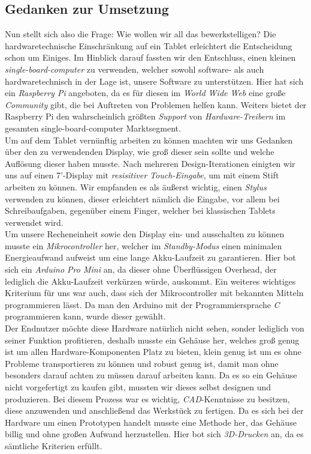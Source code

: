 \subsection{Gedanken zur Umsetzung}
Nun stellt sich also die Frage: Wie wollen wir all das bewerkstelligen? Die hardwaretechnische Einschränkung auf ein Tablet erleichtert die Entscheidung schon um Einiges. Im Hinblick darauf fassten wir den Entschluss, einen kleinen \textit{single-board-computer} zu verwenden, welcher sowohl software- als auch hardwaretechnisch in der Lage ist, unsere Software zu unterstützen. Hier hat sich ein \textit{Raspberry Pi} angeboten, da es für diesen im \textit{World Wide Web} eine große \textit{Community} gibt, die bei Auftreten von Problemen helfen kann. Weiters bietet der Raspberry Pi den wahrscheinlich größten \textit{Support} von \textit{Hardware-Treibern} im gesamten single-board-computer Marktsegment.\\

Um auf dem Tablet vernünftig arbeiten zu können machten wir uns Gedanken über den zu verwendenden Display, wie groß dieser sein sollte und welche Auflösung dieser haben musste. Nach mehreren Design-Iterationen einigten wir uns auf einen 7'-Display mit \textit{resisitiver Touch-Eingabe}, um mit einem Stift arbeiten zu können. Wir empfanden es als äußerst wichtig, einen \textit{Stylus} verwenden zu können, dieser erleichtert nämlich die Eingabe, vor allem bei Schreibaufgaben, gegenüber einem Finger, welcher bei klassischen Tablets verwendet wird.\\

Um unsere Recheneinheit sowie den Display ein- und ausschalten zu können musste ein \textit{Mikrocontroller} her, welcher im \textit{Standby-Modus} einen minimalen Energieaufwand aufweist um eine lange Akku-Laufzeit zu garantieren. Hier bot sich ein \textit{Arduino Pro Mini} an, da dieser ohne Überflüssigen Overhead, der lediglich die Akku-Laufzeit verkürzen würde, auskommt. Ein weiteres wichtiges Kriterium für uns war auch, dass sich der Mikrocontroller mit bekannten Mitteln programmieren lässt. Da man den Arduino mit der Programmiersprache \textit{C} programmieren kann, wurde dieser gewählt.\\

Der Endnutzer möchte diese Hardware natürlich nicht sehen, sonder lediglich von seiner Funktion profitieren, deshalb musste ein Gehäuse her, welches groß genug ist um allen Hardware-Komponenten Platz zu bieten, klein genug ist um es ohne Probleme transportieren zu können und robust genug ist, damit man ohne besonders darauf achten zu müssen darauf arbeiten kann. Da es so ein Gehäuse nicht vorgefertigt zu kaufen gibt, mussten wir dieses selbst designen und produzieren. Bei diesem Prozess war es wichtig, \textit{CAD}-Kenntnisse zu besitzen, diese anzuwenden und anschließend das Werkstück zu fertigen. Da es sich bei der Hardware um einen Prototypen handelt musste eine Methode her, das Gehäuse billig und ohne großen Aufwand herzustellen. Hier bot sich \textit{3D-Drucken} an, da es sämtliche Kriterien erfüllt.\\

